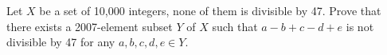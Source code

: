 Let $ X$ be a set of 10,000 integers, none of them is divisible by 47. Prove that there exists a 2007-element subset $ Y$ of $ X$ such that $ a - b + c - d + e$ is not divisible by 47 for any $ a,b,c,d,e \in Y.$